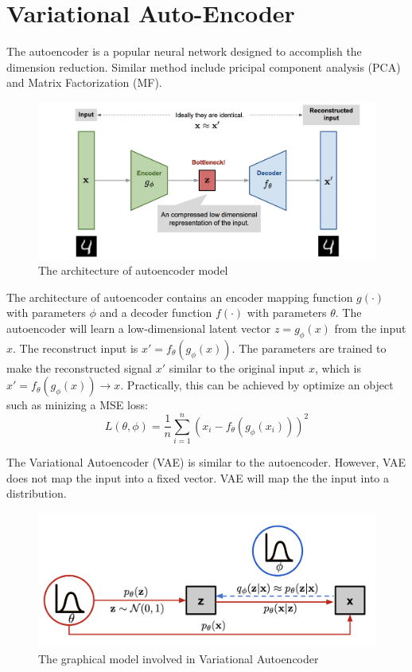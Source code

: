 \documentclass{article}
\begin{document}
\section{Variational Auto-Encoder}
The autoencoder is a popular neural network designed to accomplish the dimension reduction. Similar method include pricipal component analysis (PCA) and Matrix Factorization (MF).
\begin{figure}[ht]
  \centering
  \includegraphics[width = 0.8\linewidth]{figures/autoencoder-architecture.png}
  \caption{The architecture of autoencoder model~\cite{weng2018VAE}}
  \label{fig::fig}
\end{figure}
The architecture of autoencoder contains an encoder mapping function $g(\cdot)$ with parameters $\phi$ and a decoder function $f(\cdot)$ with parameters $\theta$. The autoencoder will learn a low-dimensional latent vector $z=g_{\phi}(x)$ from the input $x$. The reconstruct input is $x'=f_{\theta}(g_{\phi}(x))$. The parameters are trained to make the reconstructed signal $x'$ similar to the original input $x$, which is $x'=f_{\theta}(g_{\phi}(x))\rightarrow x$. Practically, this can be achieved by optimize an object such as minizing a MSE loss:
\begin{equation}
L(\theta, \phi) = \frac{1}{n}\sum_{i=1}^{n}(x_i-f_\theta(g_\phi(x_i)))^2
\end{equation}

The Variational Autoencoder (VAE) is similar to the autoencoder. However, VAE does not map the input into a fixed vector. VAE will map the the input into a distribution.

\begin{figure}[ht]
  \centering
  \includegraphics[width = 0.7\linewidth]{figures/VAE-graphical-model.png}
  \caption{The graphical model involved in Variational Autoencoder}
  \label{fig::VAE}
\end{figure}
\end{document}
